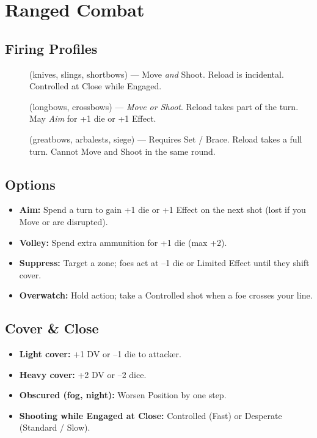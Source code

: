 \section{Ranged Combat}\label{sec:ranged}

\subsection{Firing Profiles}\label{subsec:firing_profiles}
\begin{description}
    \item[] (knives, slings, shortbows) --- Move \emph{and} Shoot. Reload is incidental. Controlled at Close while Engaged.
    \item[] (longbows, crossbows) --- \emph{Move or Shoot}. Reload takes part of the turn. May \emph{Aim} for +1 die or +1 Effect.
    \item[] (greatbows, arbalests, siege) --- Requires Set / Brace. Reload takes a full turn. Cannot Move and Shoot in the same round.
\end{description}

\subsection{Options}\label{subsec:ranged_options}
\begin{itemize}
    \item \textbf{Aim:} Spend a turn to gain +1 die or +1 Effect on the next shot (lost if you Move or are disrupted).
    \item \textbf{Volley:} Spend extra ammunition for +1 die (max +2).
    \item \textbf{Suppress:} Target a zone; foes act at --1 die or Limited Effect until they shift cover.
    \item \textbf{Overwatch:} Hold action; take a Controlled shot when a foe crosses your line.
\end{itemize}

\subsection{Cover \& Close}\label{subsec:cover_close}
\begin{itemize}
    \item \textbf{Light cover:} +1 DV or --1 die to attacker.
    \item \textbf{Heavy cover:} +2 DV or --2 dice.
    \item \textbf{Obscured (fog, night):} Worsen Position by one step.
    \item \textbf{Shooting while Engaged at Close:} Controlled (Fast) or Desperate (Standard / Slow).
\end{itemize}

